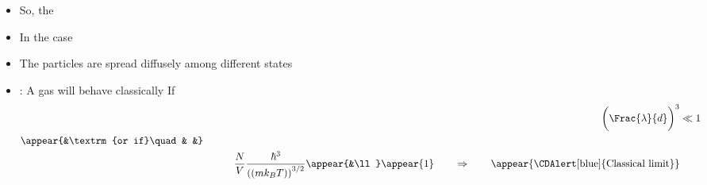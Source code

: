 \begin{frame}
\frametitle{\texorpdfstring{\culine[\sectiontitleulinecolor]{\sectiontitle}}{\sectiontitle} }

\begin{itemize}
	\item So, the  
\item In the case   

\item The particles are spread diffusely among different states
\item {}: A gas will behave classically
If 
\[
\begin{aligned}
& & \qquad \bigg( \Frac{\lambda}{d}  \bigg)^{3} &\ll 1  \\
\appear{&\textrm{or if}\quad& &} \\
& & \qquad \frac{N}{V} \frac{\hbar^{3}}{ \textrm{((}m k_{B} T \textrm{))}^{3 / 2}} \appear{&\ll} \appear{1} \qquad \Rightarrow \qquad \text {\appear{\CDAlert[blue]{Classical limit}}} \\
\end{aligned}
\]
\end{itemize}

\endofslide 
\end{frame}

